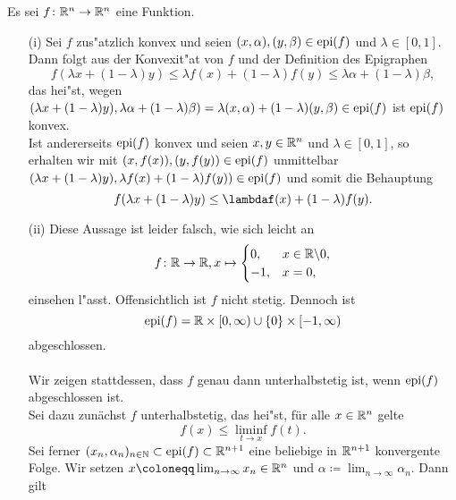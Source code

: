 
Es sei $f\colon\mathbb{R}^n\to\mathbb{R}^n$ eine Funktion.

\begin{itemize}
 \item[(i)] Sei $f$ zus"atzlich konvex und seien $(x,\alpha),(y,\beta)\in\operatorname{epi}(f)$ und $\lambda\in[0,1]$.
 Dann folgt aus der Konvexit"at von $f$ und der Definition des Epigraphen
 \begin{displaymath}
  f(\lambda x+(1-\lambda)y)\leq \lambda f(x)+(1-\lambda)f(y)\leq \lambda\alpha+(1-\lambda)\beta,
 \end{displaymath}
 das hei"st, wegen $(\lambda x+(1-\lambda)y),\lambda\alpha+(1-\lambda)\beta)=\lambda(x,\alpha)+(1-\lambda)(y,\beta)\in\operatorname{epi}(f)$
 ist $\operatorname{epi}(f)$ konvex.\\
 Ist andererseits $\operatorname{epi}(f)$ konvex und seien $x,y\in\mathbb{R}^n$ und $\lambda\in[0,1]$, so erhalten wir mit
 $(x,f(x)),(y,f(y))\in\operatorname{epi}(f)$ unmittelbar $(\lambda x+(1-\lambda)y),\lambda f(x)+(1-\lambda)f(y))\in \operatorname{epi}(f)$ und somit die Behauptung
 \begin{displaymath}
  f(\lambda x+(1-\lambda)y)\leq\lambdaf(x)+(1-\lambda)f(y).
 \end{displaymath}
 \item[(ii)] Diese Aussage ist leider falsch, wie sich leicht an 
 \begin{displaymath}
  f\colon\mathbb{R}\to\mathbb{R}, x\mapsto \begin{cases}
                       0, &x\in\mathbb{R}\backslash{0},\\
                       -1, &x=0,
                      \end{cases}
 \end{displaymath}
 einsehen l"asst. Offensichtlich ist $f$ nicht stetig. Dennoch ist 
 \begin{displaymath}
  \operatorname{epi}(f)=\mathbb{R}\times[0,\infty)\cup\{0\}\times[-1,\infty)
 \end{displaymath}
 abgeschlossen.
 \\ \\
 Wir zeigen stattdessen, dass $f$ genau dann unterhalbstetig ist, wenn $\operatorname{epi}(f)$ abgeschlossen ist.\\
 Sei dazu zunächst $f$ unterhalbstetig, das hei"st, für alle $x\in\mathbb{R}^n$ gelte 
 \begin{displaymath}
  f(x)\leq\liminf_{t\to x}f(t).
 \end{displaymath}
 Sei ferner $(x_n,\alpha_n)_{n\in\mathbb{N}}\subset\operatorname{epi}(f)\subset\mathbb{R}^{n+1}$ eine beliebige in $\mathbb{R}^{n+1}$ konvergente Folge.
 Wir setzen $x\coloneqq \lim_{n\to\infty} x_n\in\Rn$ und $\alpha\coloneqq\lim_{n\to\infty}\alpha_n$. Dann gilt

\end{itemize}
